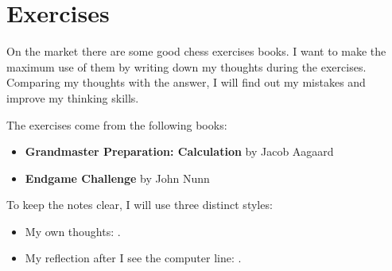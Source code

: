 \chapter{Exercises}
On the market there are some good chess exercises books. 
I want to make the maximum use of them by writing down my thoughts 
during the exercises. Comparing my thoughts with the answer, I will 
find out my mistakes and improve my thinking skills.

The exercises come from the following books:
\begin{itemize}
    \item \textbf{Grandmaster Preparation: Calculation} by Jacob Aagaard \cite{aagaard:2012}
    \item \textbf{Endgame Challenge} by John Nunn \cite{nunn:2002}
\end{itemize}
To keep the notes clear, I will use three distinct styles:
\begin{itemize}
  \item My own thoughts: . 
  \item My reflection after I see the computer line: . 
\end{itemize}


